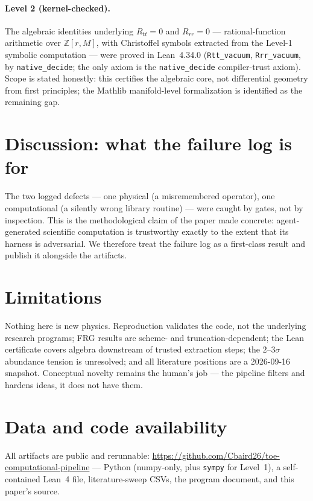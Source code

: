 \documentclass[11pt]{article}
\begin{document}
\paragraph{Level 2 (kernel-checked).} The algebraic identities underlying
$R_{tt} = 0$ and $R_{rr} = 0$ --- rational-function arithmetic over
$\mathbb{Z}[r, M]$, with Christoffel symbols extracted from the Level-1
symbolic computation --- were proved in Lean~4.34.0
(\texttt{Rtt\_vacuum}, \texttt{Rrr\_vacuum}, by \texttt{native\_decide}; the
only axiom is the \texttt{native\_decide} compiler-trust axiom). Scope is
stated honestly: this certifies the algebraic core, not differential geometry
from first principles; the Mathlib manifold-level formalization is identified
as the remaining gap.

\section{Discussion: what the failure log is for}

The two logged defects --- one physical (a misremembered operator), one
computational (a silently wrong library routine) --- were caught by gates, not
by inspection. This is the methodological claim of the paper made concrete:
agent-generated scientific computation is trustworthy exactly to the extent
that its harness is adversarial. We therefore treat the failure log as a
first-class result and publish it alongside the artifacts.

\section{Limitations}

Nothing here is new physics. Reproduction validates the code, not the
underlying research programs; FRG results are scheme- and
truncation-dependent; the Lean certificate covers algebra downstream of
trusted extraction steps; the $2$--$3\sigma$ abundance tension is unresolved;
and all literature positions are a 2026-09-16 snapshot. Conceptual novelty
remains the human's job --- the pipeline filters and hardens ideas, it does
not have them.

\section{Data and code availability}

All artifacts are public and rerunnable:
\url{https://github.com/Cbaird26/toe-computational-pipeline} ---
Python (numpy-only, plus \texttt{sympy} for Level~1), a self-contained Lean~4
file, literature-sweep CSVs, the program document, and this paper's source.
\end{document}
